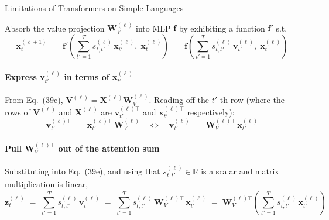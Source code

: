 \begin{question}{Limitations of Transformers on Simple Languages}

\begin{subquestion}
    Absorb the value projection $\mathbf{W}_V^{(\ell)}$ into MLP $\mathbf{f}$ by exhibiting a function $\mathbf{f}'$ s.t.
    \begin{equation*}
        \mathbf{x}_t^{(\ell+1)} \;=\; \mathbf{f}'\!\left(\sum_{t'=1}^{T} s_{t,t'}^{(\ell)}\, \mathbf{x}_{t'}^{(\ell)},\; \mathbf{x}_t^{(\ell)}\right) \;=\; \mathbf{f}\!\left(\sum_{t'=1}^{T} s_{t,t'}^{(\ell)}\, \mathbf{v}_{t'}^{(\ell)},\; \mathbf{x}_t^{(\ell)}\right)
    \end{equation*}

    \paragraph{Express $\mathbf{v}_{t'}^{(\ell)}$ in terms of $\mathbf{x}_{t'}^{(\ell)}$}
    From Eq.~(39c), $\mathbf{V}^{(\ell)} = \mathbf{X}^{(\ell)} \mathbf{W}_V^{(\ell)}$. Reading off the $t'$-th row (where the rows of $\mathbf{V}^{(\ell)}$ and $\mathbf{X}^{(\ell)}$ are $\mathbf{v}_{t'}^{(\ell)\top}$ and $\mathbf{x}_{t'}^{(\ell)\top}$ respectively):
    \begin{equation*}
        \mathbf{v}_{t'}^{(\ell)\top} \;=\; \mathbf{x}_{t'}^{(\ell)\top}\, \mathbf{W}_V^{(\ell)}
        \quad\Longleftrightarrow\quad
        \mathbf{v}_{t'}^{(\ell)} \;=\; \mathbf{W}_V^{(\ell)\top}\, \mathbf{x}_{t'}^{(\ell)}
    \end{equation*}

    \paragraph{Pull $\mathbf{W}_V^{(\ell)\top}$ out of the attention sum}
    Substituting into Eq.~(39e), and using that $s_{t,t'}^{(\ell)} \in \mathbb{R}$ is a scalar and matrix multiplication is linear,
    \begin{equation*}
        \mathbf{z}_t^{(\ell)} \;=\; \sum_{t'=1}^{T} s_{t,t'}^{(\ell)}\, \mathbf{v}_{t'}^{(\ell)}
        \;=\; \sum_{t'=1}^{T} s_{t,t'}^{(\ell)}\, \mathbf{W}_V^{(\ell)\top}\, \mathbf{x}_{t'}^{(\ell)}
        \;=\; \mathbf{W}_V^{(\ell)\top} \!\left(\sum_{t'=1}^{T} s_{t,t'}^{(\ell)}\, \mathbf{x}_{t'}^{(\ell)}\right)
    \end{equation*}


\end{subquestion}
\end{question}
